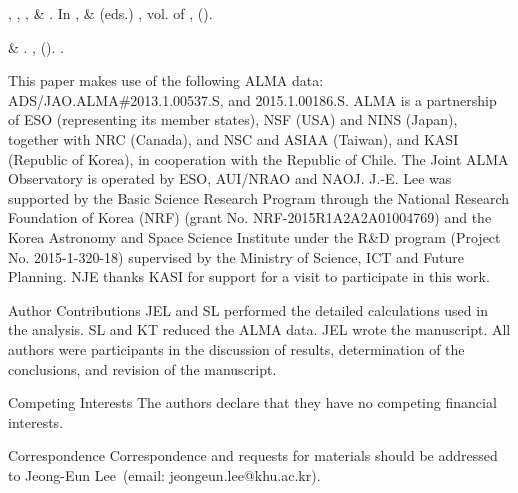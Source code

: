 \documentclass{nature}
\begin{document}
\begin{thebibliography}{10}
, ,
  ,  \&
\newblock {}.
\newblock In ,  \&
   (eds.) \emph{}, vol.  of
  \emph{},  ().

 \& 
\newblock {}.
\newblock \emph{} \textbf{},
   ().
\newblock {}.

\end{thebibliography}


\begin{addendum}
 \item  
This paper makes use of the following ALMA data: ADS/JAO.ALMA\#2013.1.00537.S, and 2015.1.00186.S.
ALMA is a partnership of ESO (representing its member states), NSF (USA) and
NINS (Japan), together with NRC (Canada), and NSC and ASIAA (Taiwan), 
and KASI (Republic of Korea), in cooperation with the Republic of Chile. 
The Joint ALMA Observatory is
operated by ESO, AUI/NRAO and NAOJ. 
 J.-E. Lee was supported by the Basic Science Research
Program through the National Research Foundation of Korea (NRF)
(grant No. NRF-2015R1A2A2A01004769)
and the Korea Astronomy and Space Science Institute under the R\&D
program (Project No. 2015-1-320-18) supervised by the Ministry of Science,
ICT and Future Planning. NJE thanks KASI for support
for a visit to participate in this work.

 \item[Author Contributions]  JEL and SL performed the detailed
calculations used in the analysis.  SL and KT reduced the ALMA data.    
JEL wrote the manuscript.  All authors
were participants in the discussion of results, determination of the
conclusions, and revision of the manuscript.


 \item[Competing Interests] The authors declare that they have no
competing financial interests.
 \item[Correspondence] Correspondence and requests for materials
should be addressed to Jeong-Eun Lee~(email: jeongeun.lee@khu.ac.kr).



\end{addendum}
\end{document}
